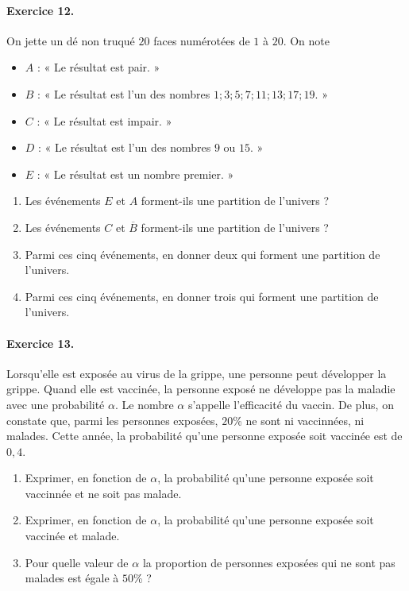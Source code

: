 \documentclass[11pt]{article}
\begin{document}
\paragraph{Exercice 12.} On jette un dé non truqué  $20$ faces numérotées de $1$
à $20$. On note
\begin{itemize}
  \item $A$ : « Le résultat est pair. »
  \item $B$ : « Le résultat est l'un des nombres $1; 3; 5; 7; 11; 13; 17; 19$. »
  \item $C$ : « Le résultat est impair. »
  \item $D$ : « Le résultat est l'un des nombres $9$ ou $15$. »
  \item $E$ : « Le résultat est un nombre premier. »
\end{itemize}
\begin{enumerate}
  \item Les événements $E$ et $A$ forment-ils une partition de l'univers ?
  \item Les événements $C$ et $\overline B$ forment-ils une partition de l'univers ?
  \item Parmi ces cinq événements, en donner deux qui forment une partition de
    l'univers.
  \item Parmi ces cinq événements, en donner trois qui forment une partition de
    l'univers.
\end{enumerate}

\paragraph{Exercice 13.} Lorsqu'elle est exposée au virus de la grippe, une
personne peut développer la grippe. Quand elle est vaccinée, la personne exposé
ne développe pas la maladie avec une probabilité $\alpha$. Le nombre $\alpha$
s'appelle l'efficacité du vaccin. De plus, on constate que, parmi les personnes
exposées, $20$\% ne sont ni vaccinnées, ni malades. Cette année, la probabilité
qu'une personne exposée soit vaccinée est de $0,4$.
\begin{enumerate}
  \item Exprimer, en fonction de $\alpha$, la probabilité qu'une personne
    exposée soit vaccinnée et ne soit pas malade.
  \item Exprimer, en fonction de $\alpha$, la probabilité qu'une personne
    exposée soit vaccinée et malade.
  \item Pour quelle valeur de $\alpha$ la proportion de personnes exposées qui
    ne sont pas malades est égale à $50$\% ?
\end{enumerate}
\end{document}
